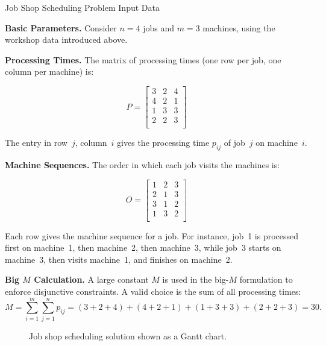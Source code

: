 \begin{example}{Job Shop Scheduling Problem Input Data}{}

\textbf{Basic Parameters.}
Consider $n = 4$ jobs and $m = 3$ machines, using the workshop data introduced above.

\textbf{Processing Times.}
The matrix of processing times (one row per job, one column per machine) is:

\[
P =
\begin{bmatrix}
3 & 2 & 4 \\
4 & 2 & 1 \\
1 & 3 & 3 \\
2 & 2 & 3 \\
\end{bmatrix}
\]

The entry in row~$j$, column~$i$ gives the processing time $p_{ij}$ of job~$j$ on machine~$i$.

\textbf{Machine Sequences.}
The order in which each job visits the machines is:

\[
O =
\begin{bmatrix}
1 & 2 & 3 \\
2 & 1 & 3 \\
3 & 1 & 2 \\
1 & 3 & 2 \\
\end{bmatrix}
\]

Each row gives the machine sequence for a job.
For instance, job~1 is processed first on machine~1, then machine~2, then machine~3,
while job~3 starts on machine~3, then visits machine~1, and finishes on machine~2.

\textbf{Big \(M\) Calculation.}
A large constant $M$ is used in the big-$M$ formulation to enforce disjunctive constraints.
A valid choice is the sum of all processing times:
\[
M = \sum_{i=1}^{m} \sum_{j=1}^{n} p_{ij} = (3+2+4)+(4+2+1)+(1+3+3)+(2+2+3) = 30.
\]
\end{example}

\begin{figure}
\caption{Job shop scheduling solution shown as a Gantt chart.}\label{fig:jssp}%
\end{figure}



